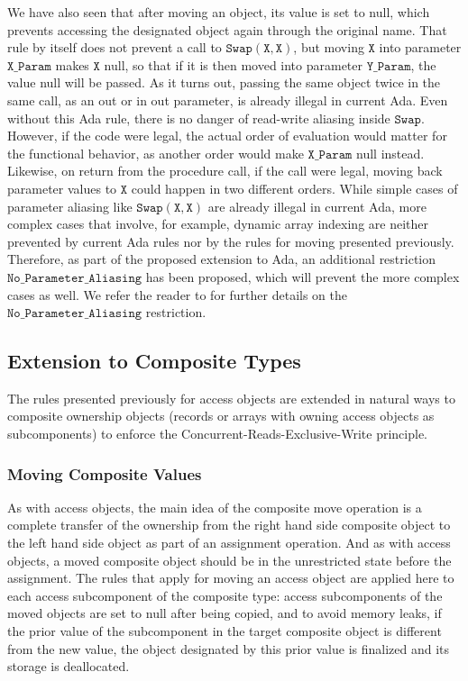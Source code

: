 \documentclass{llncs}
\newcommand\var[1]{\ensuremath{\mathtt{#1}}}
\newcommand{\keyword}[1]{\textsf{#1}}
\begin{document}
We have also seen that after moving an object, its value is set to null, which prevents accessing the designated object again through the original name.
That rule by itself does not prevent a call to \var{Swap(X, X)}, but moving \var{X} into parameter \var{X\_Param} makes \var{X} null, so that if it is then moved into parameter \var{Y\_Param}, the value null will be passed.   As it turns out, passing the same object twice in the same call, as an \keyword{out} or \keyword{in out} parameter, is already illegal in current Ada.
Even without this Ada rule, there is no danger of read-write aliasing inside \var{Swap}. However, if the code were legal, the actual order of evaluation would matter for the functional behavior, as another order would make \var{X\_Param} null
instead. Likewise, on return from the procedure call, if the call were legal, moving back parameter values to \var{X} could happen in two different orders.
While simple cases of parameter aliasing like \var{Swap(X,X)} are already illegal in current Ada, more complex cases that involve, for example, dynamic array indexing are neither
prevented by current Ada rules nor by the rules for moving presented previously. Therefore, as part of the proposed
extension to Ada, an additional restriction \var{No\_Parameter\_Aliasing} has been proposed,
which will prevent the more complex cases as well. We refer the reader to \cite{AI2018} for further details on the \var{No\_Parameter\_Aliasing} restriction.


\subsection{Extension to Composite Types}
\label{subsec:ownershipComposite}

The rules presented previously for access objects are extended in natural ways to composite ownership objects (records or arrays with owning access objects as subcomponents) to enforce the Concurrent-Reads-Exclusive-Write principle.

\subsubsection{Moving Composite Values}
\label{subsubsec:movingComposite}

As with access objects, the main idea of the composite move operation is a complete transfer of the ownership from the right hand side composite object to the left hand
side object as part of an assignment operation. And as with access objects, a moved composite object should be in the unrestricted state before the assignment. The rules that apply for moving an
access object are applied here to each access subcomponent of the composite type: access subcomponents of the moved objects are set to null after being copied, and to avoid memory leaks, if the
prior value of the subcomponent in the target composite object is different from the new value, the object designated by this prior value is finalized and its storage is deallocated.
\end{document}
